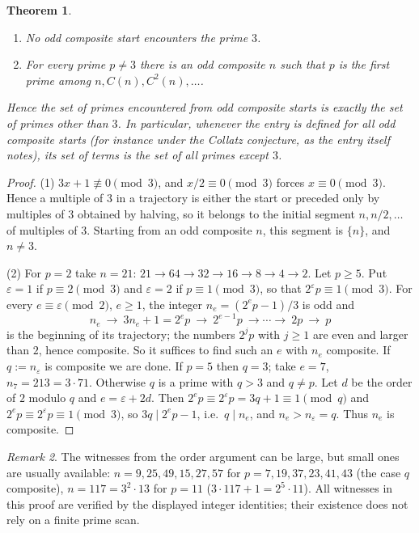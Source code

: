 \documentclass[11pt,a4paper]{article}
\newtheorem{theorem}{Theorem}[section]
\theoremstyle{definition}
\theoremstyle{remark}
\newtheorem{remark}[theorem]{Remark}
\numberwithin{equation}{section}
\begin{document}
\begin{theorem}\label{B:P:thm:A273216}
\begin{enumerate}
\item No odd composite start encounters the prime $3$.
\item For every prime $p\ne3$ there is an odd composite $n$ such that $p$ is the
first prime among $n,C(n),C^2(n),\dots$.
\end{enumerate}
Hence the set of primes encountered from odd composite starts is exactly the
set of primes other than $3$. In particular, whenever the entry is defined for
all odd composite starts (for instance under the Collatz conjecture, as the
entry itself notes), its set of terms is the set of all primes except $3$.
\end{theorem}

\begin{proof}
(1) $3x+1\not\equiv0\pmod3$, and $x/2\equiv0\pmod3$ forces $x\equiv0\pmod3$.
Hence a multiple of $3$ in a trajectory is either the start or preceded only by
multiples of $3$ obtained by halving, so it belongs to the initial segment
$n,n/2,\dots$ of multiples of $3$. Starting from an odd composite $n$, this
segment is $\{n\}$, and $n\neq3$.

(2) For $p=2$ take $n=21$: $21\to64\to32\to16\to8\to4\to2$. Let $p\ge5$. Put
$\varepsilon=1$ if $p\equiv2\pmod3$ and $\varepsilon=2$ if $p\equiv1\pmod3$, so
that $2^\varepsilon p\equiv1\pmod3$. For every $e\equiv\varepsilon\pmod2$,
$e\ge1$, the integer $n_e=(2^ep-1)/3$ is odd and
\[
 n_e\ \to\ 3n_e+1=2^ep\ \to\ 2^{e-1}p\ \to\cdots\to\ 2p\ \to\ p
\]
is the beginning of its trajectory; the numbers $2^jp$ with $j\ge1$ are even and
larger than $2$, hence composite. So it suffices to find such an $e$ with $n_e$
composite. If $q:=n_\varepsilon$ is composite we are done. If $p=5$ then $q=3$;
take $e=7$, $n_7=213=3\cdot71$. Otherwise $q$ is a prime with $q>3$ and $q\ne p$.
Let $d$ be the order of $2$ modulo $q$ and $e=\varepsilon+2d$. Then
$2^ep\equiv2^\varepsilon p=3q+1\equiv1\pmod q$ and
$2^ep\equiv2^\varepsilon p\equiv1\pmod3$, so $3q\mid2^ep-1$, i.e.\ $q\mid n_e$,
and $n_e>n_\varepsilon=q$. Thus $n_e$ is composite.
\end{proof}

\begin{remark}
The witnesses from the order argument can be large, but small ones are usually
available: $n=9,25,49,15,27,57$ for $p=7,19,37,23,41,43$ (the case $q$
composite), $n=117=3^2\cdot13$ for $p=11$ ($3\cdot117+1=2^5\cdot11$). All witnesses in this proof are verified by the displayed integer
identities; their existence does not rely on a finite prime scan.
\end{remark}
\end{document}
